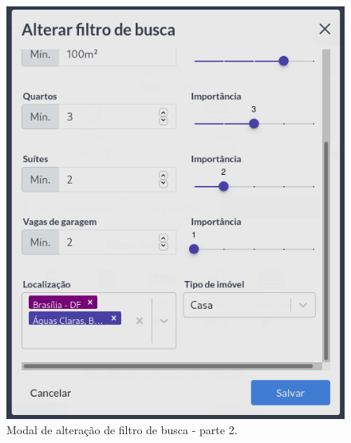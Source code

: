 \begin{figure}[H]
    \centering
    \includegraphics[scale=0.35]{figuras/desenvolvimento/componente_filtro4.png}
    \caption[Modal de alteração de filtro de busca - parte 2]{Modal de alteração de filtro de busca - parte 2.}
    \label{fig:componente_filtro4}
\end{figure}

